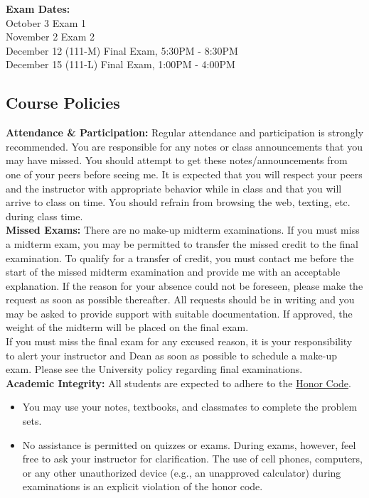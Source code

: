\documentclass[11pt]{article}
\begin{document}
\textbf{Exam Dates:} \\
October 3  \hspace{4.87cm} Exam 1\\
November 2 \hspace{4.55cm} Exam 2\\
December 12 (111-M) \hspace{2.90cm} Final Exam, 5:30PM - 8:30PM \\
December 15 (111-L) \hspace{3cm} Final Exam, 1:00PM - 4:00PM \\



\subsection*{Course Policies}

\textbf{Attendance \& Participation:} Regular attendance and participation is strongly recommended. You are responsible for any notes or class announcements that you may have missed. You should attempt to get these notes/announcements from one of your peers before seeing me. It is expected that you will respect your peers and the instructor with appropriate behavior while in class and that you will arrive to class on time. You should refrain from browsing the web, texting, etc. during class time. \\


\textbf{Missed Exams:} There are no make-up midterm examinations. If you must miss a midterm exam, you may be permitted to transfer the missed credit to the final examination. To qualify for a transfer of credit, you must contact me before the start of the missed midterm examination and provide me with an acceptable explanation. If the reason for your absence could not be foreseen, please make the request as soon as possible thereafter. All requests should be in writing and you may be asked to provide support with suitable documentation. If approved, the weight of the midterm will be placed on the final exam. \\

If you must miss the final exam for any excused reason, it is your responsibility to alert your instructor and Dean as soon as possible to schedule a make-up exam. Please see the University policy regarding final examinations.\\

\textbf{Academic Integrity:} All students are expected to adhere to the \href{http://elon.smartcatalogiq.com/en/2015-2016/Student-Handbook/The-Honor-System-Code-of-Conduct-and-Processes/Section-I-The-Honor-System}{Honor Code}. 
\begin{itemize}
	\item You may use your notes, textbooks, and classmates to complete the problem sets.
	\item No assistance is permitted on quizzes or exams. During exams, however, feel free to ask your instructor for clarification. The use of cell phones, computers, or any other unauthorized device (e.g., an unapproved calculator) during examinations is an explicit violation of the honor code.
\end{itemize}
\end{document}
